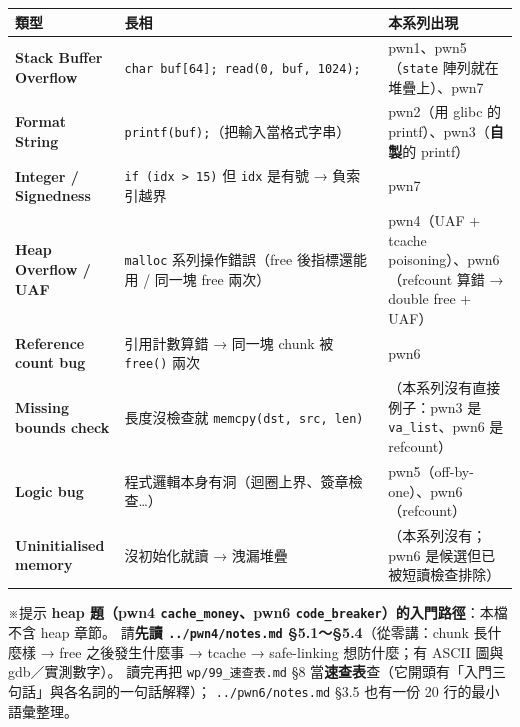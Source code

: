 \documentclass[10pt,a4paper]{article}
\newcounter{none}
\renewenvironment{quote}{%
  \begin{mdframed}[linewidth=0pt,innerleftmargin=0pt,innerrightmargin=0pt,
    innerbottommargin=0pt,innertopmargin=0pt,skipabove=0.55em,skipbelow=0.55em,
    leftmargin=0.9em,rightmargin=0.4em,startcode={\color{quotebar}\vrule width 2.6pt},%
    endcode={}]%
  \itshape\color{black}%
}{%
  \end{mdframed}%
}
\begin{document}
{\def\LTcaptype{none} %
\begin{longtable}[]{@{}
  >{\raggedright\arraybackslash}p{}
  >{\raggedright\arraybackslash}p{}
  >{\raggedright\arraybackslash}p{}@{}}
\toprule\noalign{}
\begin{minipage}[b]{\linewidth}\raggedright
類型
\end{minipage} & \begin{minipage}[b]{\linewidth}\raggedright
長相
\end{minipage} & \begin{minipage}[b]{\linewidth}\raggedright
本系列出現
\end{minipage} \\
\midrule\noalign{}
\endhead
\bottomrule\noalign{}
\endlastfoot
\textbf{Stack Buffer Overflow} &
\texttt{char\ \allowbreak{}buf{[}64{]};\ \allowbreak{}read(0,\allowbreak{}\ \allowbreak{}buf,\allowbreak{}\ \allowbreak{}1024);} &
pwn1、pwn5（\texttt{state} 陣列就在堆疊上）、pwn7 \\
\textbf{Format String} & \texttt{printf(buf);}（把輸入當格式字串） &
pwn2（用 glibc 的 printf）、pwn3（\textbf{自製}的 printf） \\
\textbf{Integer / Signedness} & \texttt{if\ \allowbreak{}(idx\ \allowbreak{}\textgreater{}\allowbreak{}\ \allowbreak{}15)}
但 \texttt{idx} 是有號 → 負索引越界 & pwn7 \\
\textbf{Heap Overflow / UAF} & \texttt{malloc} 系列操作錯誤（free
後指標還能用 / 同一塊 free 兩次） & pwn4（UAF + tcache
poisoning）、pwn6（refcount 算錯 → double free + UAF） \\
\textbf{Reference count bug} & 引用計數算錯 → 同一塊 chunk 被
\texttt{free()} 兩次 & pwn6 \\
\textbf{Missing bounds check} & 長度沒檢查就
\texttt{memcpy(dst,\allowbreak{}\ \allowbreak{}src,\allowbreak{}\ \allowbreak{}len)} & （本系列沒有直接例子：pwn3 是
\texttt{va\_\allowbreak{}list}、pwn6 是 refcount） \\
\textbf{Logic bug} & 程式邏輯本身有洞（迴圈上界、簽章檢查\ldots） &
pwn5（off-by-one）、pwn6（refcount） \\
\textbf{Uninitialised memory} & 沒初始化就讀 → 洩漏堆疊 &
（本系列沒有；pwn6 是候選但已被短讀檢查排除） \\
\end{longtable}
}

\begin{quote}
※提示 \textbf{heap 題（pwn4 \texttt{cache\_\allowbreak{}money}、pwn6
\texttt{code\_\allowbreak{}breaker}）的入門路徑}：本檔不含 heap 章節。 請\textbf{先讀
\texttt{../\allowbreak{}pwn4/\allowbreak{}notes.\allowbreak{}md} §5.1～§5.4}（從零講：chunk 長什麼樣 → free
之後發生什麼事 → tcache → safe-linking 想防什麼；有 ASCII 圖與
gdb／實測數字）。 讀完再把 \texttt{wp/\allowbreak{}99\_\allowbreak{}速查表.\allowbreak{}md} §8
當\textbf{速查表}查（它開頭有「入門三句話」與各名詞的一句話解釋）；
\texttt{../\allowbreak{}pwn6/\allowbreak{}notes.\allowbreak{}md} §3.5 也有一份 20 行的最小語彙整理。
\end{quote}
\end{document}
